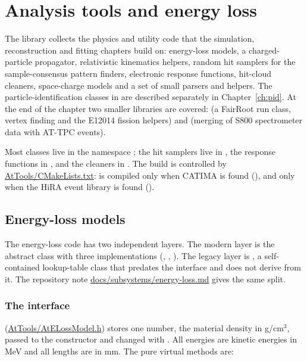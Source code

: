 \chapter{Analysis tools and energy loss}
\label{ch:tools}

The  library collects the physics and utility code that the simulation, reconstruction and fitting
chapters build on: energy-loss models, a charged-particle propagator, relativistic kinematics helpers, random hit
samplers for the sample-consensus pattern finders, electronic response functions, hit-cloud cleaners, space-charge
models and a set of small parsers and helpers. The particle-identification classes in  are
described separately in Chapter~\ref{ch:pid}. At the end of the chapter two smaller libraries are covered:
 (a FairRoot run class, vertex finding and the E12014 fission helpers) and  (merging
of S800 spectrometer data with AT-TPC events).

Most classes live in the namespace ; the hit samplers live in , the response
functions in , and the cleaners in . The build is controlled by
\url{AtTools/CMakeLists.txt}:  is compiled only when CATIMA is found (), and
 only when the HiRA event library is found ().

\section{Energy-loss models}
\label{sec:tools-eloss}

The energy-loss code has two independent layers. The modern layer is the abstract class
 with three implementations (, ,
). The legacy layer is , a self-contained lookup-table class
that predates the interface and does not derive from it. The repository note
\url{docs/subsystems/energy-loss.md} gives the same split.

\subsection{The  interface}

 (\url{AtTools/AtELossModel.h}) stores one number, the material density  in
g/cm$^3$, passed to the constructor and changed with . All energies are kinetic energies in
MeV and all lengths are in mm. The pure virtual methods are:

